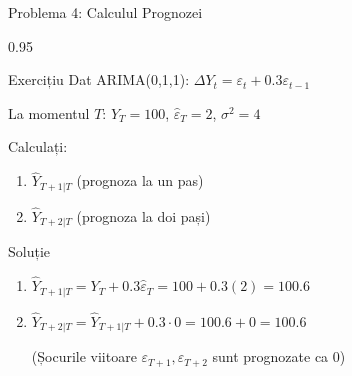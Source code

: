 \documentclass[9pt, aspectratio=169, t]{beamer}
\begin{document}
\begin{frame}{Problema 4: Calculul Prognozei}
    \begin{cminipage}{0.95\textwidth}
    \begin{block}{Exercițiu}
        Dat ARIMA(0,1,1): $\Delta Y_t = \varepsilon_t + 0.3\varepsilon_{t-1}$

        La momentul $T$: $Y_T = 100$, $\hat{\varepsilon}_T = 2$, $\sigma^2 = 4$

        Calculați:
        \begin{enumerate}\setlength{\itemsep}{0pt}
            \item $\hat{Y}_{T+1|T}$ (prognoza la un pas)
            \item $\hat{Y}_{T+2|T}$ (prognoza la doi pași)
        \end{enumerate}
    \end{block}

    \vspace{0.3cm}
    \pause
    \begin{exampleblock}{Soluție}
        \begin{enumerate}\setlength{\itemsep}{0pt}
            \item $\hat{Y}_{T+1|T} = Y_T + 0.3\hat{\varepsilon}_T = 100 + 0.3(2) = \mathbf{100.6}$
            \item $\hat{Y}_{T+2|T} = \hat{Y}_{T+1|T} + 0.3 \cdot 0 = 100.6 + 0 = \mathbf{100.6}$

            (Șocurile viitoare $\varepsilon_{T+1}, \varepsilon_{T+2}$ sunt prognozate ca 0)
        \end{enumerate}
    \end{exampleblock}
    \end{cminipage}
\end{frame}
\end{document}
